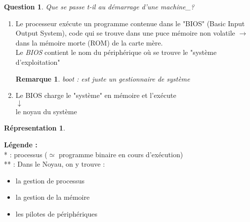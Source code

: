 \documentclass[12pt,a4paper]{report}
\newtheorem*{rem}{Remarque}
\newtheorem*{q}{Question}
\newtheorem*{schema}{Répresentation}
\begin{document}
\bigskip

\begin{q}
Que se passe t-il au démarrage d'une machine_?
\end{q}
\smallskip
\begin{enumerate}
\item Le processeur exécute un programme contenue dans le "BIOS" (Basic Input Output System), code qui se trouve dans une puce mémoire non volatile $\rightarrow$ dans la mémoire morte (ROM) de la carte mère.\\
Le \emph{BIOS} contient le nom du périphérique où se trouve le "système d'exploitation"\\
\begin{rem}
boot : est juste un gestionnaire de système
\end{rem}
\item Le BIOS charge le "système" en mémoire et l'exécute\\
\hspace*{3,5cm} $\downarrow$\\
\hspace*{3cm} le noyau du système
\end{enumerate}

\medskip

\begin{schema} \end{schema}
\begin{center}
\end{center}

\textbf{Légende :\\}
* : processus ($\simeq$ programme binaire en cours d'exécution)\\
** : Dans le Noyau, on y trouve :
\begin{itemize}
\item la gestion de processus
\item la gestion de la mémoire
\item les pilotes de périphériques
\end{itemize}
\end{document}
